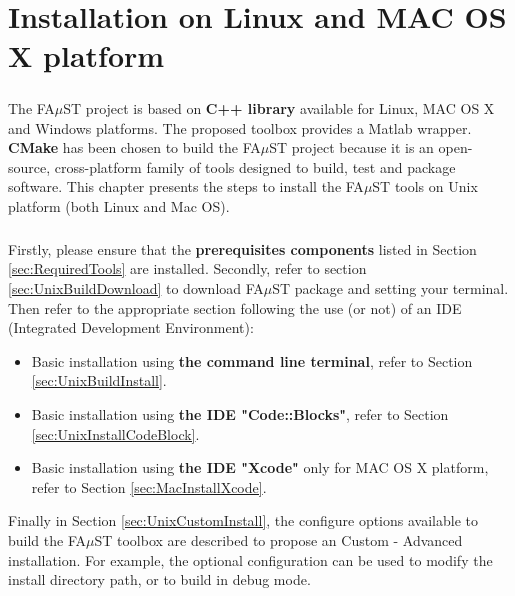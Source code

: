 \chapter{Installation on Linux and MAC OS X platform}\label{sec:InstallUnix}

\paragraph{}The FA$\mu$ST project is based on \textbf{C++ library} available for Linux, MAC OS X and Windows platforms. The proposed toolbox provides a Matlab wrapper. \textbf{CMake} has been chosen to build the FA$\mu$ST project because it is an open-source, cross-platform family of tools designed to build, test and package software. This chapter presents the steps to install the FA$\mu$ST tools on Unix platform (both Linux and Mac OS). 

\paragraph{}Firstly, please ensure that the \textbf{prerequisites components} listed in Section \ref{sec:RequiredTools} are installed. Secondly, refer to section 
\ref{sec:UnixBuildDownload} to download FA$\mu$ST package and setting your terminal. Then refer to the appropriate section following the use (or not) of an IDE (Integrated Development Environment): 
\begin{itemize}
\item Basic installation using \textbf{the command line terminal}, refer to Section \ref{sec:UnixBuildInstall}.
\item Basic installation using \textbf{the IDE "Code::Blocks"}, refer to Section \ref{sec:UnixInstallCodeBlock}. 
\item Basic installation using \textbf{the IDE "Xcode"} only for MAC OS X platform, refer to Section \ref{sec:MacInstallXcode}. 
\end{itemize}

Finally in Section \ref{sec:UnixCustomInstall}, the configure options available to build the FA$\mu$ST toolbox are described to propose an Custom - Advanced installation. For example, the optional configuration can be used to modify the install directory path, or to build in debug mode.  

